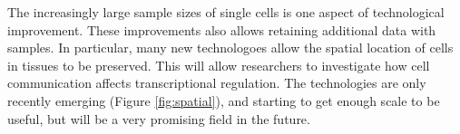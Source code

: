 The increasingly large sample sizes of single cells is one aspect of technological improvement. These improvements also allows retaining additional data with samples. In particular, many new technologoes allow the spatial location of cells in tissues to be preserved. This will allow researchers to investigate how cell communication affects transcriptional regulation. The technologies are only recently emerging (Figure \ref{fig:spatial}), and starting to get enough scale to be useful, but will be a very promising field in the future.
